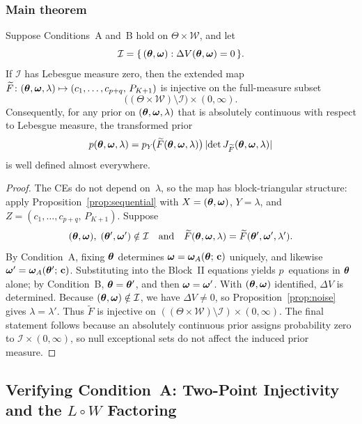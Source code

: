 \subsubsection{Main theorem}
\label{appB:theorem}

\begin{theorem}
\label{thm:main}
Suppose Conditions~A and~B hold on $\Theta \times \mathcal{W}$, and let
\[
  \mathcal{I}
  = \{\,(\boldsymbol{\theta}, \boldsymbol{\omega}) : \Delta V(\boldsymbol{\theta}, \boldsymbol{\omega}) = 0\,\}.
\]
If $\mathcal{I}$ has Lebesgue measure zero, then the extended map
$\widetilde{F} \colon (\boldsymbol{\theta}, \boldsymbol{\omega}, \lambda) \mapsto
(c_1, \ldots, c_{p+q},\, P_{K+1})$
is injective on the full-measure subset
\[
  \bigl((\Theta \times \mathcal{W}) \setminus \mathcal{I}\bigr)
  \times (0,\infty).
\]
Consequently, for any prior on $(\boldsymbol{\theta},\boldsymbol{\omega},\lambda)$ that is absolutely
continuous with respect to Lebesgue measure, the transformed prior
\[
  p(\boldsymbol{\theta},\boldsymbol{\omega},\lambda)
  = p_Y\!\bigl(\widetilde{F}(\boldsymbol{\theta},\boldsymbol{\omega},\lambda)\bigr)\,
    \lvert \det J_{\widetilde{F}}(\boldsymbol{\theta},\boldsymbol{\omega},\lambda)\rvert
\]
is well defined almost everywhere.
\end{theorem}

\begin{proof}
The CEs do not depend on~$\lambda$, so the map has
block-triangular structure: apply Proposition~\ref{prop:sequential} with
$X = (\boldsymbol{\theta}, \boldsymbol{\omega})$, $Y = \lambda$, and
$Z = (c_1, \ldots, c_{p+q},\, P_{K+1})$.
Suppose
\[
  (\boldsymbol{\theta}, \boldsymbol{\omega}),\; (\boldsymbol{\theta}', \boldsymbol{\omega}') \notin \mathcal{I}
  \quad\text{and}\quad
  \widetilde{F}(\boldsymbol{\theta}, \boldsymbol{\omega}, \lambda)
  = \widetilde{F}(\boldsymbol{\theta}', \boldsymbol{\omega}', \lambda').
\]
By Condition~A, fixing $\boldsymbol{\theta}$ determines
$\boldsymbol{\omega} = \boldsymbol{\omega}_A(\boldsymbol{\theta};\, \mathbf{c})$ uniquely, and likewise
$\boldsymbol{\omega}' = \boldsymbol{\omega}_A(\boldsymbol{\theta}';\, \mathbf{c})$. Substituting into
the Block~II equations yields $p$~equations in $\boldsymbol{\theta}$ alone;
by Condition~B, $\boldsymbol{\theta} = \boldsymbol{\theta}'$, and then $\boldsymbol{\omega} = \boldsymbol{\omega}'$.
With $(\boldsymbol{\theta}, \boldsymbol{\omega})$ identified, $\Delta V$ is determined. Because
$(\boldsymbol{\theta},\boldsymbol{\omega}) \notin \mathcal{I}$, we have $\Delta V \neq 0$, so
Proposition~\ref{prop:noise} gives $\lambda = \lambda'$.
Thus $\widetilde{F}$ is injective on
$((\Theta \times \mathcal{W}) \setminus \mathcal{I}) \times (0,\infty)$.
The final statement follows because an absolutely continuous prior assigns
probability zero to $\mathcal{I} \times (0,\infty)$, so null exceptional sets
do not affect the induced prior measure.
\end{proof}


\subsection{Verifying Condition~A: Two-Point Injectivity and the $L \circ W$ Factoring}
\label{appB:condition_a_verification}


